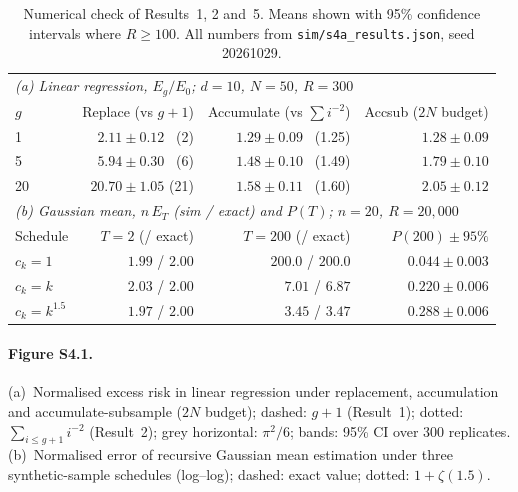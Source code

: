 \begin{table}[h]
\caption{Numerical check of Results~1, 2 and~5. Means shown with 95\% confidence
intervals where $R\ge100$. All numbers from \texttt{sim/s4a\_results.json},
seed 20261029.}
\label{tab:S4-1}
\small
\begin{tabular}{lrrr}
\toprule
\multicolumn{4}{l}{\emph{(a) Linear regression, $E_g/E_0$; $d=10$, $N=50$, $R=300$}} \\
$g$ & Replace (vs $g+1$) & Accumulate (vs $\sum i^{-2}$) & Accsub ($2N$ budget) \\
\midrule
1  & $2.11\pm0.12$ \ (2)   & $1.29\pm0.09$ \ (1.25) & $1.28\pm0.09$ \\
5  & $5.94\pm0.30$ \ (6)   & $1.48\pm0.10$ \ (1.49) & $1.79\pm0.10$ \\
20 & $20.70\pm1.05$ (21)   & $1.58\pm0.11$ \ (1.60) & $2.05\pm0.12$ \\
\midrule
\multicolumn{4}{l}{\emph{(b) Gaussian mean, $n\,E_T$ (sim / exact) and $P(T)$; $n=20$, $R=20{,}000$}} \\
Schedule & $T=2$ (/ exact) & $T=200$ (/ exact) & $P(200)\pm95\%$ \\
\midrule
$c_k=1$         & $1.99$ / $2.00$ & $200.0$ / $200.0$ & $0.044\pm0.003$ \\
$c_k=k$         & $2.03$ / $2.00$ & $7.01$  / $6.87$  & $0.220\pm0.006$ \\
$c_k=k^{1.5}$   & $1.97$ / $2.00$ & $3.45$  / $3.47$  & $0.288\pm0.006$ \\
\bottomrule
\end{tabular}
\end{table}

\paragraph{Figure S4.1.}
(a)~Normalised excess risk in linear regression under replacement, accumulation and
accumulate-subsample ($2N$ budget); dashed: $g+1$ (Result~1); dotted:
$\sum_{i\leq g+1}i^{-2}$ (Result~2); grey horizontal: $\pi^2/6$; bands: 95\% CI
over 300 replicates. (b)~Normalised error of recursive Gaussian mean estimation
under three synthetic-sample schedules (log--log); dashed: exact value; dotted:
$1+\zeta(1.5)$.

%


